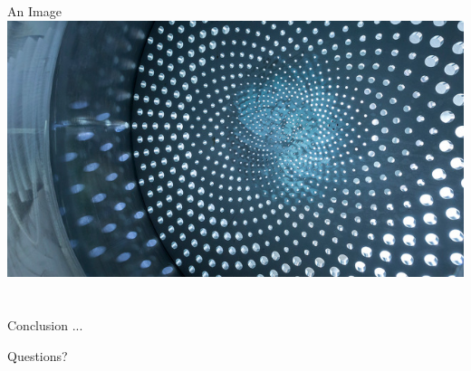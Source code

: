 \documentclass[aspectratio=169]{beamer}
\begin{document}
  \begin{frame}{An Image}
    \centering
    \includegraphics[height=0.6\textheight]{figures/photoexample-169}
  \end{frame}

  \section*{}
  \begin{frame}{Conclusion}
    ...
  \end{frame}

  \begin{frame}[c]
    \centering
    \Large Questions?
  \end{frame}
\end{document}
